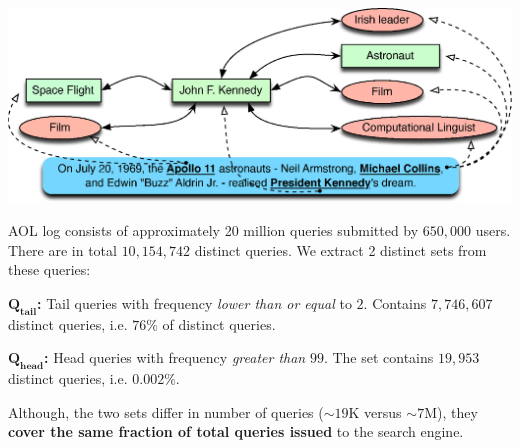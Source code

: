 \documentclass[a0,portrait,final]{a0poster}
\newcommand{\tail}[1]{$\mathbf{Q_{tail}}${}}
\newcommand{\head}[1]{$\mathbf{Q_{head}}${}}
\newcommand{\pbox}[3]{
	\begin{center}
	\psshadowbox[linewidth=2mm,framearc=0.1,framesep=1em,shadowsize=4mm,shadowcolor=lightgray,linecolor=#2]{
		\begin{minipage}[t][][t]{#1}{
			#3 %
		}\end{minipage}
	}
	\end{center}
}
\newlength\ptitlespace
\newcommand{\ptitle}[1]{
	\vspace{\ptitlespace}
	\pbox{0.92\columnwidth}{arancioneisti}{
		\begin{center}
		\textsc{\LARGE\bluisti{#1}} %
		\end{center}
	}
	\vspace{0.5\ptitlespace}
}
\begin{document}
\begin{multicols}{2}
\vspace{5mm}
\begin{center}
\includegraphics[width=0.92\columnwidth]{img/annotation-example.eps}
\end{center}


\ptitle{Analysis}

AOL log consists of approximately 20 million queries submitted by $650,000$ users. There are in total $10,154,742$ distinct queries. 
We extract 2 distinct sets from these queries: 
\begin{description}
	\item{\textbf{\tail{}:}} Tail queries with frequency \emph{lower than or equal} to $2$. Contains $7,746,607$ distinct queries, i.e. $76\%$ of distinct queries. %
	\item{\textbf{\head{}:}} Head queries with frequency \emph{greater than} $99$. The set contains $19,953$ distinct queries, i.e. $0.002\%$. %
\end{description}
Although, the two sets differ in number of queries ($\sim19$K versus $\sim7$M), they \textbf{cover the same fraction of total queries issued} to the search engine. %


\end{multicols}
\end{document}
